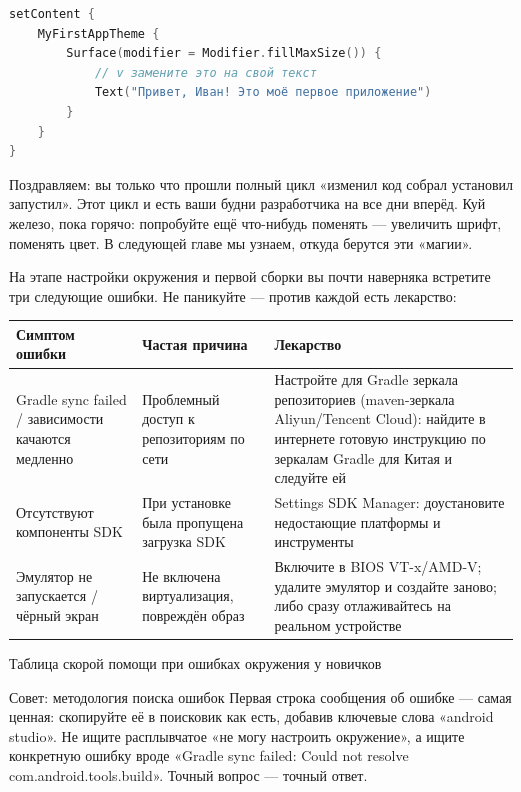 \begin{lstlisting}[language=Kotlin]
setContent {
    MyFirstAppTheme {
        Surface(modifier = Modifier.fillMaxSize()) {
            // v замените это на свой текст
            Text("Привет, Иван! Это моё первое приложение")
        }
    }
}
\end{lstlisting}

Поздравляем: вы только что прошли полный цикл «изменил код собрал установил запустил». Этот цикл и есть ваши будни разработчика на все дни вперёд. Куй железо, пока горячо: попробуйте ещё что-нибудь поменять — увеличить шрифт, поменять цвет. В следующей главе мы узнаем, откуда берутся эти «магии».


На этапе настройки окружения и первой сборки вы почти наверняка встретите три следующие ошибки. Не паникуйте — против каждой есть лекарство:

\begin{center}
\begin{tabularx}{\linewidth}{|X|X|X|}
\hline
\textbf{Симптом ошибки} & \textbf{Частая причина} & \textbf{Лекарство} \tabularnewline
\hline
Gradle sync failed / зависимости качаются медленно & Проблемный доступ к репозиториям по сети & Настройте для Gradle зеркала репозиториев (maven-зеркала Aliyun/Tencent Cloud): найдите в интернете готовую инструкцию по зеркалам Gradle для Китая и следуйте ей \tabularnewline
Отсутствуют компоненты SDK & При установке была пропущена загрузка SDK & Settings SDK Manager: доустановите недостающие платформы и инструменты \tabularnewline
Эмулятор не запускается / чёрный экран & Не включена виртуализация, повреждён образ & Включите в BIOS VT-x/AMD-V; удалите эмулятор и создайте заново; либо сразу отлаживайтесь на реальном устройстве \tabularnewline
\hline
\end{tabularx}
\end{center}

\begin{center}\small\color{gray}Таблица скорой помощи при ошибках окружения у новичков\end{center}

\begin{tcbinfo}{Совет: методология поиска ошибок}
Первая строка сообщения об ошибке — самая ценная: скопируйте её в поисковик как есть, добавив ключевые слова «android studio». Не ищите расплывчатое «не могу настроить окружение», а ищите конкретную ошибку вроде «Gradle sync failed: Could not resolve com.android.tools.build». Точный вопрос — точный ответ.

\end{tcbinfo}

